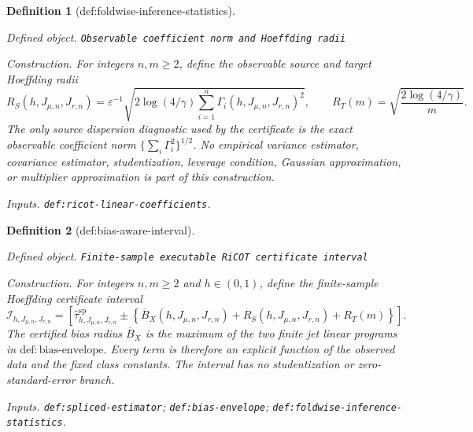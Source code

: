 \documentclass{article}
\newtheorem{definition}{Definition}
\begin{document}
\begin{definition}[def:foldwise-inference-statistics]\label{def:foldwise-inference-statistics}
\par\smallskip\noindent\emph{Defined object.} \texttt{Observable coefficient norm and Hoeffding radii}
\par\smallskip\noindent\emph{Construction.} For integers \(n,m\ge2\), define the observable source and target Hoeffding radii
\[
R_S(h,J_{\mu,n},J_{r,n})
=\varepsilon^{-1}\sqrt{2\log(4/\gamma)\sum_{i=1}^n\Gamma_i(h,J_{\mu,n},J_{r,n})^2},
\qquad
R_T(m)=\sqrt{\frac{2\log(4/\gamma)}{m}}.
\]
The only source dispersion diagnostic used by the certificate is the exact observable coefficient norm \(\{\sum_i\Gamma_i^2\}^{1/2}\). No empirical variance estimator, covariance estimator, studentization, leverage condition, Gaussian approximation, or multiplier approximation is part of this construction.
\par\smallskip\noindent\emph{Inputs.} \texttt{def:\allowbreak{}ricot-\allowbreak{}linear-\allowbreak{}coefficients}.
\end{definition}

\begin{definition}[def:bias-aware-interval]\label{def:bias-aware-interval}
\par\smallskip\noindent\emph{Defined object.} \texttt{Finite-\allowbreak{}sample executable RiCOT certificate interval}
\par\smallskip\noindent\emph{Construction.} For integers \(n,m\ge2\) and \(h\in(0,1)\), define the finite-sample Hoeffding certificate interval
\[
\mathcal I_{h,J_{\mu,n},J_{r,n}}
=\left[
\widehat\tau^{\mathrm{sp}}_{h,J_{\mu,n},J_{r,n}}
\pm\left\{\overline B_X(h,J_{\mu,n},J_{r,n})+R_S(h,J_{\mu,n},J_{r,n})+R_T(m)\right\}
\right].
\]
The certified bias radius \(\overline B_X\) is the maximum of the two finite jet linear programs in \(\mathrm{def:bias\text{-}envelope}\). Every term is therefore an explicit function of the observed data and the fixed class constants. The interval has no studentization or zero-standard-error branch.
\par\smallskip\noindent\emph{Inputs.} \texttt{def:\allowbreak{}spliced-\allowbreak{}estimator}; \texttt{def:\allowbreak{}bias-\allowbreak{}envelope}; \texttt{def:\allowbreak{}foldwise-\allowbreak{}inference-\allowbreak{}statistics}.
\end{definition}
\end{document}
